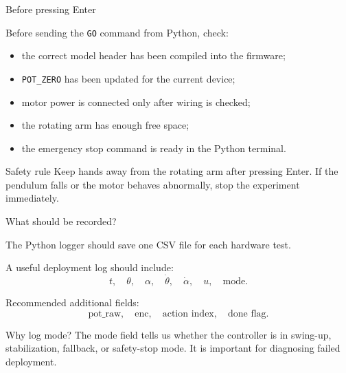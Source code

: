 \documentclass[aspectratio=169]{beamer}
\begin{document}
\begin{frame}{Before pressing Enter}

Before sending the \texttt{GO} command from Python, check:

\begin{itemize}
    \item the correct model header has been compiled into the firmware;
    \vspace{0.18cm}

    \item \texttt{POT\_ZERO} has been updated for the current device;
    \vspace{0.18cm}

    \item motor power is connected only after wiring is checked;
    \vspace{0.18cm}

    \item the rotating arm has enough free space;
    \vspace{0.18cm}

    \item the emergency stop command is ready in the Python terminal.
\end{itemize}

\vspace{0.2cm}

\begin{alertblock}{Safety rule}
\small
Keep hands away from the rotating arm after pressing Enter.
If the pendulum falls or the motor behaves abnormally, stop the experiment immediately.
\end{alertblock}

\end{frame}


\begin{frame}{What should be recorded?}

The Python logger should save one CSV file for each hardware test.

\vspace{0.18cm}

A useful deployment log should include:
\[
t,\quad
\theta,\quad
\alpha,\quad
\dot{\theta},\quad
\dot{\alpha},\quad
u,\quad
\text{mode}.
\]

\vspace{0.2cm}

Recommended additional fields:
\[
\text{pot\_raw},\quad
\text{enc},\quad
\text{action index},\quad
\text{done flag}.
\]

\vspace{0.2cm}

\begin{block}{Why log mode?}
\small
The mode field tells us whether the controller is in swing-up, stabilization, fallback, or safety-stop mode.
It is important for diagnosing failed deployment.
\end{block}

\end{frame}
\end{document}
